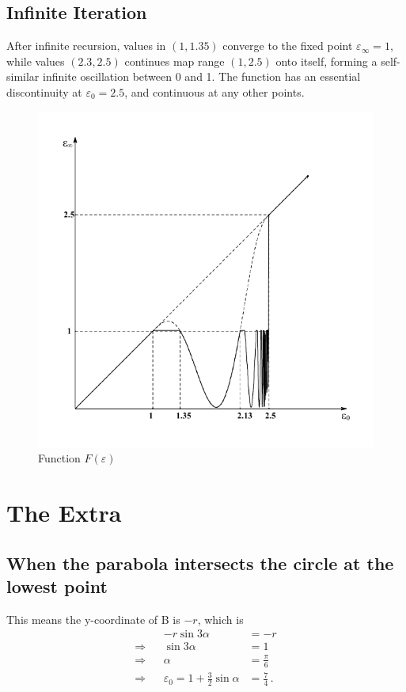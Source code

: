 \documentclass[]{article}
\begin{document}
\subsection{Infinite Iteration}

After infinite recursion, values in $(1, 1.35)$ converge to the fixed point $\varepsilon_\infty = 1$, while values $(2.3, 2.5)$ continues map range $(1, 2.5)$ onto itself, forming a self-similar infinite oscillation between 0 and 1.
The function has an essential discontinuity at $\varepsilon_0 = 2.5$, and continuous at any other points.
\begin{figure}[!h]
	\centering
	\includegraphics[scale=1]{fb.pdf}
	\caption{Function $F(\varepsilon)$}
	\label{fig:fb}
\end{figure}

\section{The Extra}

\subsection{When the parabola intersects the circle at the lowest point}
\label{sec:low}
This means the y-coordinate of B is $-r$, which is
\begin{align*}
&&-r\sin3\alpha&=-r\\
\Rightarrow &&\sin3\alpha &= 1\\
\Rightarrow &&\alpha &= \frac{\pi}{6}\\
\Rightarrow &&\varepsilon_0 = 1+\frac{3}{2}\sin\alpha&=\frac{7}{4}\,.
\end{align*}
\end{document}
